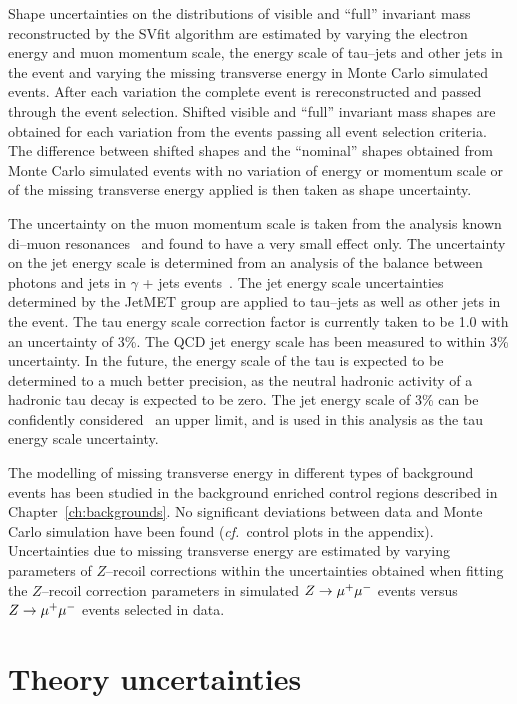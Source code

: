 Shape uncertainties on the distributions of visible and ``full'' invariant mass
reconstructed by the SVfit algorithm are estimated by varying the electron
energy and muon momentum scale, the energy scale of tau--jets and other jets in
the event and varying the missing transverse energy in Monte Carlo simulated
events.  After each variation the complete event is rereconstructed and passed
through the event selection.  Shifted visible and ``full'' invariant mass shapes
are obtained for each variation from the events passing all event selection
criteria.  The difference between shifted shapes and the ``nominal'' shapes
obtained from Monte Carlo simulated events with no variation of energy or
momentum scale or of the missing transverse energy applied is then taken as
shape uncertainty.

The uncertainty on the muon momentum scale is taken from the analysis known
di--muon resonances~\cite{CMS_AN_2010-059} and found to have a very small effect
only.  The uncertainty on the jet energy scale is determined from an analysis of
the \pt balance between photons and jets in $\gamma$ + jets
events~\cite{CMS-PAS-JME-10-010}.  The jet energy scale uncertainties determined
by the JetMET group are applied to tau--jets as well as other jets in the event.
The tau energy scale correction factor is currently taken to be 1.0 with an
uncertainty of 3\%.  The QCD jet energy scale has been measured to within 3\%
uncertainty.  In the future, the energy scale of the tau is expected to be
determined to a much better precision, as the neutral hadronic activity of a
hadronic tau decay is expected to be zero. The jet energy scale of 3\% can be
confidently considered~\cite{CMS-PAS-TAU-11-001} an upper limit, and is used in
this analysis as the tau energy scale uncertainty.

The modelling of missing transverse energy in different types of background
events has been studied in the background enriched control regions described in
Chapter~\ref{ch:backgrounds}.  No significant deviations between data and
Monte Carlo simulation have been found ({\it cf.}\ control plots in the
appendix).  Uncertainties due to missing transverse energy are estimated by
varying parameters of $Z$--recoil corrections within the uncertainties obtained
when fitting the $Z$--recoil correction parameters in simulated $Z \to \mu^+\mu^-$
events versus $Z \to \mu^+\mu^-$ events selected in data.


\section{Theory uncertainties}

